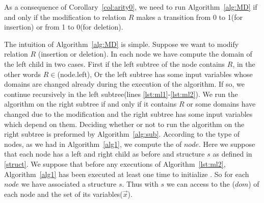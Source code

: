 \documentclass[12pt]{article}
\begin{document}
As a consequence of Corollary~\ref{col:arity0}, we need to run Algorithm~\ref{alg:MD} if and only if the modification to relation $R$ makes a transition from 0 to 1(for insertion) or from 1 to 0(for deletion). \par 
 The intuition of Algorithm~\ref{alg:MD} is simple. Suppose we want to modify relation $R$ (insertion or deletion).
In each node we have compute the domain of the left child in two cases. First if the left subtree of the node contains $R$, in the other words $R\in$\Rel(node.left), Or the left subtree has some input variables whose domains are changed already during the execution of the algorithm. If so, we continue recursively in the left subtree(lines \ref{lst:ml1}-\ref{lst:ml2}). We run the algorithm on the right subtree if and only if it contains $R$ or some domains have changed due to the modification and the right subtree has some input variables which depend on them. Deciding whether or not to run the algorithm on the right subtree is preformed by Algorithm~\ref{alg:sub}.
According to the type of nodes, as we had in Algorithm~\ref{alg1}, we compute the \dom{} of $node$. Here we suppose that each node has a left and right child as before and structure $s$ as defined in \ref{struct}. We suppose that before any executions of Algorithm~\ref{lst:ml2}, Algorithm~\ref{alg1} has been executed at least one time to initialize . So for each $node$ we have associated a structure $s$. Thus with $s$ we can access to the \dom($dom$) of each node and the set of its variables($\vec{x}$). 
\end{document}
